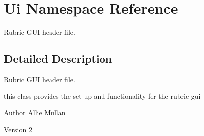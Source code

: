 \hypertarget{namespace_ui}{}\section{Ui Namespace Reference}
\label{namespace_ui}


Rubric G\+UI header file.  




\subsection{Detailed Description}
Rubric G\+UI header file. 

this class provides the set up and functionality for the rubric gui \begin{DoxyAuthor}{Author}
Allie Mullan 
\end{DoxyAuthor}
\begin{DoxyVersion}{Version}
2 
\end{DoxyVersion}
